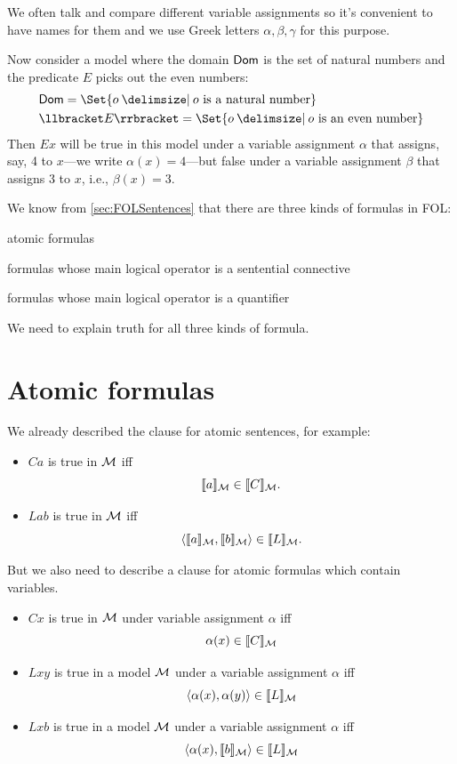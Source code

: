 We often talk and compare different variable assignments so it's convenient to have names for them and we use Greek letters $\alpha, \beta,\gamma$ for this purpose. 

Now consider a model where the domain $\mathsf{Dom}$ is the set of natural numbers and the predicate $E$ picks out the even numbers:
\begin{align*}&\domain=\Set{o \given  o\text{ is a natural number}}\\
	&\denote{E}=\Set{o \given o\text{ is an even number}}\end{align*}
Then $Ex$ will be true in this model under a variable assignment $\alpha$ that assigns, say, 4 to $x$---we write $\alpha(x)=4$---but false under a variable assignment $\beta$ that assigns 3 to $x$, i.e., $\beta(x)=3$.




We know from \cref{sec:FOLSentences} that there are three kinds of formulas in FOL:
\begin{ebullet}
	\item atomic formulas
	\item formulas whose main logical operator is a sentential connective
	\item formulas whose main logical operator is a quantifier
\end{ebullet}
We need to explain truth for all three kinds of formula.


\section{Atomic formulas}
We already described the clause for atomic sentences, for example: 
\begin{itemize}
	\item $Ca$ is true in ${\mathcal{M}}$ iff $$\llbracket a\rrbracket_{\mathcal{M}}\in\llbracket C\rrbracket_{\mathcal{M}}.$$ 
	\item $Lab$ is true in ${\mathcal{M}}$ iff $$\langle\llbracket a\rrbracket_{\mathcal{M}},\llbracket b\rrbracket_{\mathcal{M}}\rangle\in\llbracket L\rrbracket_{\mathcal{M}}.$$
\end{itemize}

But we also need to describe a clause for atomic formulas which contain variables. 
\begin{itemize}
	\item $Cx$ is true in ${\mathcal{M}}$ under variable assignment $\alpha$ iff $$\alpha(x)\in\llbracket C\rrbracket_{\mathcal{M}}$$
	\item
	$Lxy$ is true in a model ${\mathcal{M}}$ under a variable assignment $\alpha$ iff $$\langle\alpha(x),\alpha(y)\rangle\in\llbracket L\rrbracket_{\mathcal{M}}$$
	\item
	$Lxb$ is true in a model ${\mathcal{M}}$ under a variable assignment $\alpha$ iff $$\langle\alpha(x),\llbracket b\rrbracket_{\mathcal{M}}\rangle\in\llbracket L\rrbracket_{\mathcal{M}}$$
\end{itemize}

